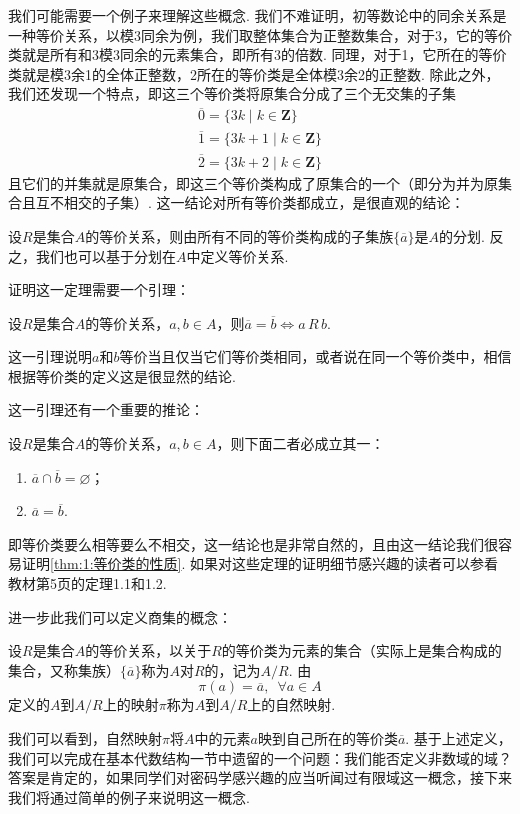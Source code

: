 我们可能需要一个例子来理解这些概念. 我们不难证明，初等数论中的同余关系是一种等价关系，以模3同余为例，我们取整体集合为正整数集合，对于3，它的等价类就是所有和3模3同余的元素集合，即所有3的倍数. 同理，对于1，它所在的等价类就是模3余1的全体正整数，2所在的等价类是全体模3余2的正整数. 除此之外，我们还发现一个特点，即这三个等价类将原集合分成了三个无交集的子集
\begin{gather*}
    \overline{0}=\{3k\mid k\in\mathbf{Z}\} \\
    \overline{1}=\{3k+1\mid k\in\mathbf{Z}\} \\
    \overline{2}=\{3k+2\mid k\in\mathbf{Z}\}
\end{gather*}
且它们的并集就是原集合，即这三个等价类构成了原集合的一个（即分为并为原集合且互不相交的子集）. 这一结论对所有等价类都成立，是很直观的结论：
\begin{theorem}\label{thm:1:等价类的性质}
    设$R$是集合$A$的等价关系，则由所有不同的等价类构成的子集族$\{\overline{a}\}$是$A$的分划. 反之，我们也可以基于分划在$A$中定义等价关系.
\end{theorem}

证明这一定理需要一个引理：
\begin{lemma}
    设$R$是集合$A$的等价关系，$a,b\in A$，则$\overline{a}=\overline{b}\iff a\,R\,b$.
\end{lemma}
这一引理说明$a$和$b$等价当且仅当它们等价类相同，或者说在同一个等价类中，相信根据等价类的定义这是很显然的结论.

这一引理还有一个重要的推论：
\begin{corollary}\label{cor:1:等价类的性质}
    设$R$是集合$A$的等价关系，$a,b\in A$，则下面二者必成立其一：
    \begin{enumerate}
        \item $\overline{a}\cap\overline{b}=\varnothing$；

        \item $\overline{a}=\overline{b}$.
    \end{enumerate}
\end{corollary}
即等价类要么相等要么不相交，这一结论也是非常自然的，且由这一结论我们很容易证明\autoref{thm:1:等价类的性质}. 如果对这些定理的证明细节感兴趣的读者可以参看教材第5页的定理1.1和1.2.

进一步此我们可以定义商集的概念：
\begin{definition}[商集] 
    设$R$是集合$A$的等价关系，以关于$R$的等价类为元素的集合（实际上是集合构成的集合，又称集族）$\{\overline{a}\}$称为$A$对$R$的，记为$A/R$. 由
    \[\pi(a) = \overline{a}, \enspace \forall a\in A\]
    定义的$A$到$A/R$上的映射$\pi$称为$A$到$A/R$上的自然映射.
\end{definition}
我们可以看到，自然映射$\pi$将$A$中的元素$a$映到自己所在的等价类$\overline{a}$. 基于上述定义，我们可以完成在基本代数结构一节中遗留的一个问题：我们能否定义非数域的域？答案是肯定的，如果同学们对密码学感兴趣的应当听闻过有限域这一概念，接下来我们将通过简单的例子来说明这一概念.


